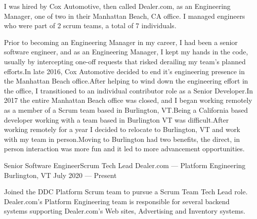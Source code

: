 

\begin{cvparagraph}
I was hired by Cox Automotive, then called Dealer.com, as an
Engineering Manager, one of two in their Manhattan Beach, CA office.
I managed engineers who were part of 2 scrum teams, a total of 7
individuals.
\end{cvparagraph}

\vspace{-1.00mm}

\begin{cvparagraph}
Prior to becoming an Engineering Manager in my career, I had been a
senior software engineer, and as an Engineering Manager, I kept my
hands in the code, usually by intercepting one-off requests that
risked derailing my team's planned efforts.\@ In late 2016, Cox
Automotive decided to end it's engineering presence in the Manhattan
Beach office.\@ After helping to wind down the engineering effort in
the office, I transitioned to an individual contributor role as a
Senior Developer.\@ In 2017 the entire Manhattan Beach office was
closed, and I began working remotely as a member of a Scrum team based
in Burlington, VT.\@ Being a California based developer working with a
team based in Burlington VT was difficult.\@ After working remotely for
a year I decided to relocate to Burlington, VT and work with my team
in person.\@ Moving to Burlington had two benefits, the direct, in
person interaction was more fun and it led to more advancement
opportunities.
\end{cvparagraph}


\begin{cventries}
  \cventry
    {Senior Software Engineer{\enskip\cdotp\enskip}Scrum Tech Lead} %
    {Dealer.com --- Platform Engineering} %
    {Burlington, VT} %
    {July 2020 --- Present} %
    {}
\end{cventries}

\vspace{-4.00mm}
\begin{cvparagraph}
Joined the DDC Platform Scrum team to pursue a Scrum Team Tech Lead role. Dealer.com's Platform Engineering team is responsible for several backend systems supporting Dealer.com's Web sites, Advertising and Inventory systems.
\end{cvparagraph}

